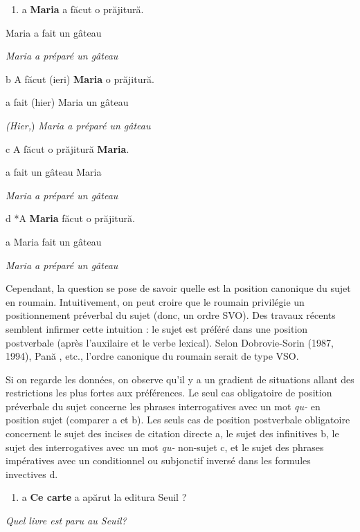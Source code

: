 \begin{enumerate}
\item \label{bkm:Ref299308425}a  \textbf{Maria}  a făcut  o  prăjitură.  


\end{enumerate}
Maria  a fait  un  gâteau

{\itshape
Maria a préparé un gâteau}

b  A  făcut  (ieri)  \textbf{Maria}  o  prăjitură.

  a  fait  (hier)  Maria  un  gâteau

  \textit{(Hier,})\textit{ Maria a préparé un gâteau}

c  A  făcut  o  prăjitură  \textbf{Maria}.

  a  fait  un  gâteau  Maria

  \textit{Maria a préparé un gâteau}

d  *A  \textbf{Maria}  făcut  o  prăjitură.

  a  Maria  fait  un  gâteau

  \textit{Maria a préparé un gâteau}

Cependant, la question se pose de savoir quelle est la position canonique du sujet en roumain. Intuitivement, on peut croire que le roumain privilégie un positionnement préverbal du sujet (donc, un ordre SVO). Des travaux récents semblent infirmer cette intuition : le sujet est préféré dans une position postverbale (après l'auxilaire et le verbe lexical). Selon Dobrovie-Sorin (1987, 1994), Pană \citet{Dindelegan2003}, etc., l'ordre canonique du roumain serait de type VSO.

Si on regarde les données, on observe qu'il y a un gradient de situations allant des restrictions les plus fortes aux préférences. Le seul cas obligatoire de position préverbale du sujet concerne les phrases interrogatives avec un mot \textit{qu-} en position sujet (comparer a et b). Les seuls cas de position postverbale obligatoire concernent le sujet des incises de citation directe a, le sujet des infinitives b, le sujet des interrogatives avec un mot \textit{qu-} non-sujet c, et le sujet des phrases impératives avec un conditionnel ou subjonctif inversé dans les formules invectives d. 


\begin{enumerate}
\item \label{bkm:Ref283930871}a  \textbf{Ce carte} a apărut la editura Seuil ?  


\end{enumerate}
{\itshape
Quel livre est paru au Seuil?}

